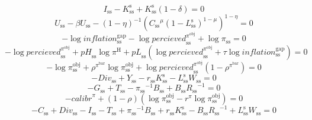 \begin{equation}
I_\mathrm{ss} - K^{\mathrm{s}}_\mathrm{ss} + {K^{\mathrm{s}}_\mathrm{ss}} \left(1 - \delta\right) = 0
\end{equation}
\begin{equation}
U_\mathrm{ss} - {\beta} {U_\mathrm{ss}} - \left(1 - \eta\right)^{-1} {\left({{C_\mathrm{ss}}^{\mu}} {\left(1 - L^{\mathrm{s}}_\mathrm{ss}\right)^{1 - \mu}}\right)^{1 - \eta}} = 0
\end{equation}
\begin{equation}
-\log{{i\!n\!f\!l\!a\!t\!i\!o\!n}^{\mathrm{gap}}_\mathrm{ss}} - \log{{p\!e\!r\!c\!i\!e\!v\!e\!d}^{\pi^{\mathrm{obj}}}_\mathrm{ss}} + \log{\pi_\mathrm{ss}} = 0
\end{equation}
\begin{equation}
-\log{{p\!e\!r\!c\!i\!e\!v\!e\!d}^{\pi^{\mathrm{obj}}}_\mathrm{ss}} + {{p\!H}_\mathrm{ss}} {\log{\pi^{\mathrm{H}}}} + {{p\!L}_\mathrm{ss}} \left(\log{{p\!e\!r\!c\!i\!e\!v\!e\!d}^{\pi^{\mathrm{obj}}}_\mathrm{ss}} + {\tau} {\log{{i\!n\!f\!l\!a\!t\!i\!o\!n}^{\mathrm{gap}}_\mathrm{ss}}}\right) = 0
\end{equation}
\begin{equation}
-\log{\pi^{\mathrm{obj}}_\mathrm{ss}} + {\rho^{\pi^{\mathrm{bar}}}} {\log{\pi^{\mathrm{obj}}_\mathrm{ss}}} + {\log{{p\!e\!r\!c\!i\!e\!v\!e\!d}^{\pi^{\mathrm{obj}}}_\mathrm{ss}}} \left(1 - \rho^{\pi^{\mathrm{bar}}}\right) = 0
\end{equation}
\begin{equation}
-{D\!i\!v}_\mathrm{ss} + Y_\mathrm{ss} - {r_\mathrm{ss}} {K^{\mathrm{s}}_\mathrm{ss}} - {L^{\mathrm{s}}_\mathrm{ss}} {W_\mathrm{ss}} = 0
\end{equation}
\begin{equation}
-G_\mathrm{ss} + T_\mathrm{ss} - {\pi_\mathrm{ss}}^{-1} {B_\mathrm{ss}} + {B_\mathrm{ss}} {R_\mathrm{ss}}^{-1} = 0
\end{equation}
\begin{equation}
-{c\!a\!l\!i\!b\!r}^{\pi} + \left(1 - \rho\right) \left(\log{\pi^{\mathrm{obj}}_\mathrm{ss}} - {r^{\pi}} {\log{\pi^{\mathrm{obj}}_\mathrm{ss}}}\right) = 0
\end{equation}
\begin{equation}
-C_\mathrm{ss} + {D\!i\!v}_\mathrm{ss} - I_\mathrm{ss} - T_\mathrm{ss} + {\pi_\mathrm{ss}}^{-1} {B_\mathrm{ss}} + {r_\mathrm{ss}} {K^{\mathrm{s}}_\mathrm{ss}} - {B_\mathrm{ss}} {R_\mathrm{ss}}^{-1} + {L^{\mathrm{s}}_\mathrm{ss}} {W_\mathrm{ss}} = 0
\end{equation}



